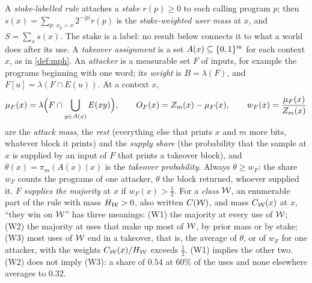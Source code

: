 A \emph{stake-labelled rule} attaches a \emph{stake} $r(p)\ge0$ to each calling program $p$; then
$s(x)=\sum_{p:\,x_p=x}2^{-|p|}r(p)$ is the \emph{stake-weighted user mass} at $x$, and $S=\sum_xs(x)$. The
stake is a label: no result below connects it to what a world does after its use. A \emph{takeover
assignment} is a set $A(x)\subseteq\{0,1\}^m$ for each context $x$, as in \cref{def:mph}. An \emph{attacker} is a
measurable set $F$ of inputs, for example the programs beginning with one word; its \emph{weight} is
$B=\lambda(F)$, and $F[u]=\lambda(F\cap E(u))$. At a context $x$,
\[\mu_F(x)=\lambda\Bigl(F\cap\bigcup_{y\in A(x)}E(xy)\Bigr),\qquad O_F(x)=Z_m(x)-\mu_F(x),\qquad
w_F(x)=\frac{\mu_F(x)}{Z_m(x)}\]
are the \emph{attack mass}, the \emph{rest} (everything else that prints $x$ and $m$ more bits, whatever block
it prints) and the \emph{supply share} (the probability that the sample at $x$ is supplied by an input of $F$
that prints a takeover block), and $\theta(x)=\pi_m(A(x)\mid x)$ is the \emph{takeover probability}. Always
$\theta\ge w_F$: the share $w_F$ counts the programs of one attacker, $\theta$ the block returned, whoever
supplied it. $F$ \emph{supplies the majority} at $x$ if $w_F(x)>\frac12$. For a \emph{class} $\mathcal W$, an
enumerable part of the rule with mass $H_{\mathcal W}>0$, also written $C(\mathcal W)$, and mass $C_{\mathcal W}(x)$ at $x$, ``they
win on $\mathcal W$'' has three meanings: (W1) the majority at every use of $\mathcal W$; (W2) the majority at uses that
make up most of $\mathcal W$, by prior mass or by stake; (W3) most uses of $\mathcal W$ end in a takeover, that is, the
average of $\theta$, or of $w_F$ for one attacker, with the weights $C_{\mathcal W}(x)/H_{\mathcal W}$ exceeds $\frac12$.
(W1) implies the other two. (W2) does not imply (W3): a share of $0.54$ at $60\%$ of the uses and none
elsewhere averages to $0.32$.
